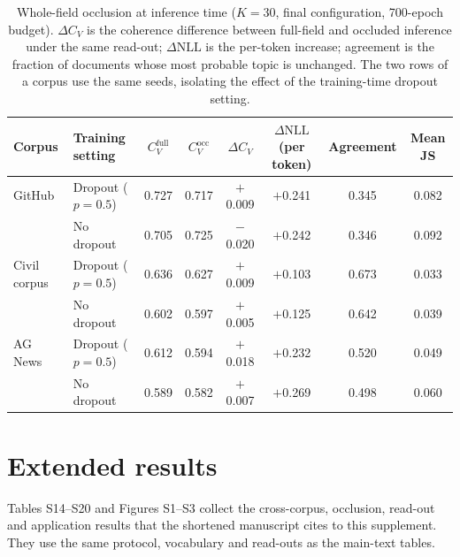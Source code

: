 \documentclass[11pt]{article}
\begin{document}
\begin{table}[t]
\centering
\caption{Whole-field occlusion at inference time ($K=30$, final configuration, 700-epoch budget). $\Delta C_V$ is the coherence difference between full-field and occluded inference under the same read-out; $\Delta\mathrm{NLL}$ is the per-token increase; agreement is the fraction of documents whose most probable topic is unchanged. The two rows of a corpus use the same seeds, isolating the effect of the training-time dropout setting.}
\label{tab:occlusion}
\small
\setlength{\tabcolsep}{4pt}
\begin{tabular}{llcccccc}
\toprule
Corpus & Training setting & $C_V^{\mathrm{full}}$ & $C_V^{\mathrm{occ}}$ & $\Delta C_V$
 & $\Delta\mathrm{NLL}$(per token) & Agreement & Mean JS \\
\midrule
GitHub & Dropout ($p=0.5$) & 0.727 & 0.717 & $+$0.009 & $+$0.241 & 0.345 & 0.082 \\
       & No dropout & 0.705 & 0.725 & $-$0.020 & $+$0.242 & 0.346 & 0.092 \\
\midrule
Civil corpus & Dropout ($p=0.5$) & 0.636 & 0.627 & $+$0.009 & $+$0.103 & 0.673 & 0.033 \\
        & No dropout & 0.602 & 0.597 & $+$0.005 & $+$0.125 & 0.642 & 0.039 \\
\midrule
AG News & Dropout ($p=0.5$) & 0.612 & 0.594 & $+$0.018 & $+$0.232 & 0.520 & 0.049 \\
        & No dropout & 0.589 & 0.582 & $+$0.007 & $+$0.269 & 0.498 & 0.060 \\
\bottomrule
\end{tabular}
\end{table}

\section{Extended results}

Tables S14--S20 and Figures S1--S3 collect the cross-corpus, occlusion,
read-out and application results that the shortened manuscript cites to this
supplement. They use the same protocol, vocabulary and read-outs as the
main-text tables.
\end{document}
